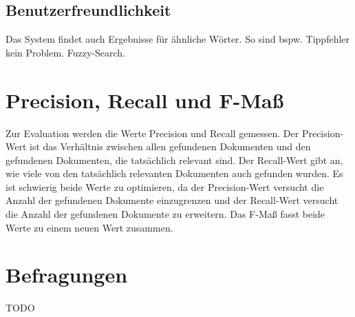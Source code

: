 \subsection*{Benutzerfreundlichkeit}
Das System findet auch Ergebnisse für ähnliche Wörter. So sind bspw. Tippfehler kein Problem. Fuzzy-Search.

\section{Precision, Recall und F-Maß}
Zur Evaluation werden die Werte Precision und Recall gemessen. Der Precision-Wert ist das Verhältnis zwischen allen gefundenen Dokumenten und den gefundenen Dokumenten, die tatsächlich relevant sind. Der Recall-Wert gibt an, wie viele von den tatsächlich relevanten Dokumenten auch gefunden wurden. Es ist schwierig beide Werte zu optimieren, da der Precision-Wert versucht die Anzahl der gefundenen Dokumente einzugrenzen und der Recall-Wert versucht die Anzahl der gefundenen Dokumente zu erweitern. Das F-Maß fasst beide Werte zu einem neuen Wert zusammen.

\section{Befragungen}
TODO